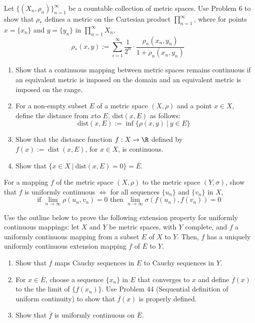 \begin{problem}
	Let \( \{ (X_n, \rho_n) \}_{n=1}^\infty \) be a countable collection of metric spaces. Use Problem 6 to show that \( \rho_* \) defines a metric on the Cartesian product \( \prod_{n=1}^\infty \), where for points \( x=\{x_n \} \) and \( y= \{ y_n \} \) in \( \prod_{n=1}^\infty X_n \), 
	\[
		\rho_* (x,y) := \sum_{i=1}^\infty \frac{1}{2^n} \cdot \frac{\rho_n(x_n, y_n)}{1+\rho_n(x_n, y_n)}
	\]
\end{problem}

\begin{problem}
	\begin{enumerate}[a]
		\item Show that a continuous mapping between metric spaces remains continuous if an equivalent metric is imposed on the domain and an equivalent metric is imposed on the range. 
		\item For a non-empty subset \( E \) of a metric space \( (X, \rho) \) and a point \( x \in X \), define the distance from \( x \)to \( E \), dist\( (x,E) \) as follows: 
		\[
			\text{dist}(x,E) := \inf \{ \rho(x,y)\ |\ y \in E \} 
		\]
		\item Show that the distance function \( f: X \rightarrow \R \) defined by \( f(x):= \operatorname{dist}(x,E) \), for \( x \in X \), is continuous. 
		\item Show that \( \{ x \in X\ |\ \text{dist}(x, E) = 0 \} = \overline{E} \). 
	\end{enumerate}
\end{problem}

\begin{problem}
	For a mapping \( f \) of the metric space \( (X, \rho) \) to the metric space \( (Y, \sigma) \), show that \( f \) is uniformly continuous \( \iff\)  for all sequences \( \{ u_n \} \) and \( \{ v_n \} \) in \( X \), 
	\[
		\text{ if } \lim_{n \rightarrow \infty} \rho(u_n, v_n) = 0 \text{ then } \lim_{n \rightarrow \infty} \sigma( f(u_n), f(v_n)) = 0 
	\]
\end{problem}

\begin{problem}
	Use the outline below to prove the following extension property for uniformly continuous mappings: let \(X \) and \( Y \) be metric spaces, with \( Y \) complete, and \( f \) a uniformly continuous mapping from a subset \( E \) of \( X \) to \( Y \). Then, \( f \) has a uniquely uniformly continuous extension mapping $\overline{f}$ of $\overline{E}$ to $Y$. 
	\begin{enumerate}[a]
		\item Show that \( f \) maps Cauchy sequences in \( E \) to Cauchy sequences in \( Y \). 
		\item For \( x \in \overline{E} \), choose a sequence \( \{ x_n \} \) in \( E \) that converges to \( x \) and define \( \overline{f}(x) \) to the the limit of \( \{ f(x_n) \} \). Use Problem 44 (Sequential definition of uniform continuity) to show that \( \overline{f}(x) \) is properly defined. 
		\item Show that \( \overline{f} \) is uniformly continuous on \( \overline{E} \). 
	\end{enumerate}
\end{problem}

